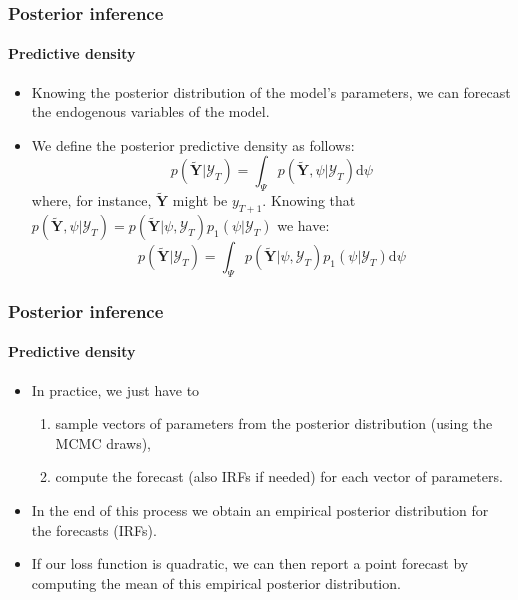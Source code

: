 \documentclass[10pt,slidestop]{beamer}
\newcommand{\sample}{\mathcal Y_T}
\begin{document}
\begin{frame}
  \frametitle{Posterior inference}
  \framesubtitle{Predictive density}

    \begin{itemize}

    \item Knowing the posterior distribution of the model's
    parameters, we can forecast the endogenous variables of the
    model.

\bigskip

    \item We define the posterior predictive density as follows:
    \[
p({\tilde{\mathbf Y}}|\sample) = \int_{\Psi}
p(\tilde{\mathbf Y}, \psi|\sample)\mathrm d\psi
    \]
    where, for instance, $\tilde{\mathbf Y}$ might be $y_{T+1}$.
    Knowing that $p(\tilde{\mathbf Y}, \psi|\sample) = p(\tilde{\mathbf Y}|
\psi,\sample)p_1(\psi|\sample)$
    we have:
  \[
    p({\tilde{\mathbf Y}}|\sample)
    = \int_{\Psi} p(\tilde{\mathbf Y}| \psi,\sample)p_1(\psi|\sample)\mathrm d\psi
  \]

  \end{itemize}
\end{frame}


\begin{frame}
  \frametitle{Posterior inference}
  \framesubtitle{Predictive density}

    \begin{itemize}

  \item In practice, we just have to
    {\small
    \begin{enumerate}
    \item sample vectors of parameters from
      the posterior distribution (using the MCMC draws),
    \item compute the forecast (also IRFs if needed) for each
      vector of parameters.
    \end{enumerate}}

\bigskip

   \item In the end of this process we obtain an empirical posterior
     distribution for the forecasts (IRFs).

\bigskip

   \item If our loss function is quadratic, we can then report a point
     forecast by computing the mean of this empirical posterior distribution.
\end{itemize}

\end{frame}
\end{document}
